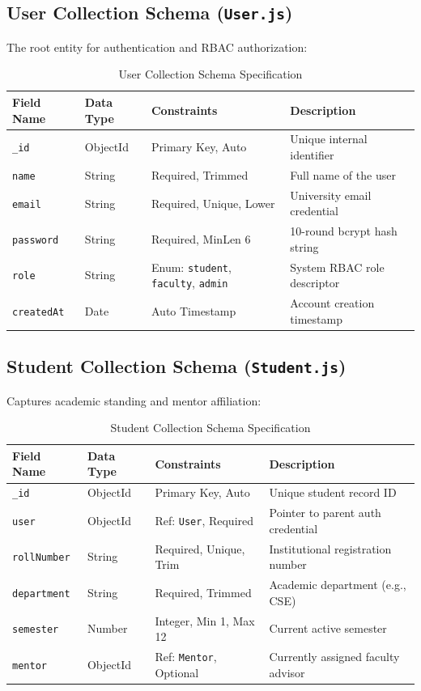 \documentclass[11pt,a4paper]{article}
\begin{document}
\subsection{User Collection Schema (\texttt{User.js})}
The root entity for authentication and RBAC authorization:
\begin{table}[H]
\centering
\small
\begin{tabularx}{\textwidth}{llp{3cm}X}
\toprule
\textbf{Field Name} & \textbf{Data Type} & \textbf{Constraints} & \textbf{Description} \\
\midrule
\texttt{\_id} & ObjectId & Primary Key, Auto & Unique internal identifier \\
\texttt{name} & String & Required, Trimmed & Full name of the user \\
\texttt{email} & String & Required, Unique, Lower & University email credential \\
\texttt{password} & String & Required, MinLen 6 & 10-round bcrypt hash string \\
\texttt{role} & String & Enum: \texttt{student}, \texttt{faculty}, \texttt{admin} & System RBAC role descriptor \\
\texttt{createdAt} & Date & Auto Timestamp & Account creation timestamp \\
\bottomrule
\end{tabularx}
\caption{User Collection Schema Specification}
\end{table}

\subsection{Student Collection Schema (\texttt{Student.js})}
Captures academic standing and mentor affiliation:
\begin{table}[H]
\centering
\small
\begin{tabularx}{\textwidth}{llp{3cm}X}
\toprule
\textbf{Field Name} & \textbf{Data Type} & \textbf{Constraints} & \textbf{Description} \\
\midrule
\texttt{\_id} & ObjectId & Primary Key, Auto & Unique student record ID \\
\texttt{user} & ObjectId & Ref: \texttt{User}, Required & Pointer to parent auth credential \\
\texttt{rollNumber} & String & Required, Unique, Trim & Institutional registration number \\
\texttt{department} & String & Required, Trimmed & Academic department (e.g., CSE) \\
\texttt{semester} & Number & Integer, Min 1, Max 12 & Current active semester \\
\texttt{mentor} & ObjectId & Ref: \texttt{Mentor}, Optional & Currently assigned faculty advisor \\
\bottomrule
\end{tabularx}
\caption{Student Collection Schema Specification}
\end{table}
\end{document}
